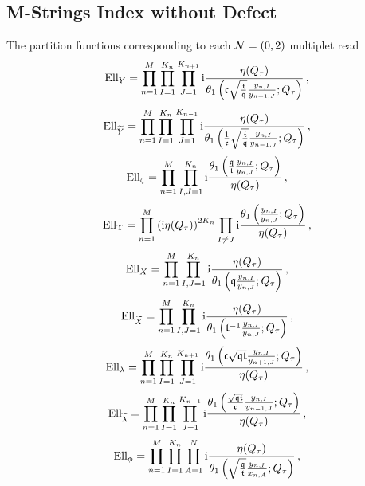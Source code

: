 \documentclass[main.tex]{subfiles}
\begin{document}
\subsection{M-Strings Index without Defect}\label{App:Ell}
The partition functions corresponding to each $\mathcal{N}=(0,2)$ multiplet read
\begin{equation}
\textrm{Ell}_Y=\prod_{n=1}^M\prod_{I=1}^{K_n}\prod_{J=1}^{K_{n+1}}\mathrm{i}\frac{\eta(Q_{\tau})}{\theta_1\left(\mathfrak{c}\sqrt{\frac{\mathfrak{t}}{\mathfrak{q}}}\frac{y_{n,I}}{y_{n+1,J}};Q_{\tau}\right)}\,,
\end{equation}
\begin{equation}
\textrm{Ell}_{\widetilde{Y}}=\prod_{n=1}^M\prod_{I=1}^{K_n}\prod_{J=1}^{K_{n-1}}\mathrm{i}\frac{\eta(Q_{\tau})}{\theta_1\left(\frac{1}{\mathfrak{c}}\sqrt{\frac{\mathfrak{t}}{\mathfrak{q}}}\frac{y_{n,I}}{y_{n-1,J}};Q_{\tau}\right)}\,,
\end{equation}
\begin{equation}
\textrm{Ell}_{\zeta}=\prod_{n=1}^M\prod_{I,J=1}^{K_n}\mathrm{i}\frac{\theta_1\left(\frac{\mathfrak{q}}{\mathfrak{t}}\frac{y_{n,I}}{y_{n,J}};Q_{\tau}\right)}{\eta(Q_{\tau})}\,,
\end{equation}
\begin{equation}
\textrm{Ell}_{\Upsilon}=\prod_{n=1}^M\left(\mathrm{i}\eta(Q_{\tau})\right)^{2K_n}\prod_{I\neq J}\mathrm{i}\frac{\theta_1\left(\frac{y_{n,I}}{y_{n,J}};Q_{\tau}\right)}{\eta(Q_{\tau})}\,,
\end{equation}
\begin{equation}
\textrm{Ell}_X=\prod_{n=1}^M\prod_{I,J=1}^{K_n}\mathrm{i}\frac{\eta(Q_{\tau})}{\theta_1\left(\mathfrak{q}\frac{y_{n,I}}{y_{n,J}};Q_{\tau}\right)}\,,
\end{equation}
\begin{equation}
\textrm{Ell}_{\widetilde{X}}=\prod_{n=1}^M\prod_{I,J=1}^{K_n}\mathrm{i}\frac{\eta(Q_{\tau})}{\theta_1\left(\mathfrak{t}^{-1}\frac{y_{n,I}}{y_{n,J}};Q_{\tau}\right)}\,,
\end{equation}
\begin{equation}
\textrm{Ell}_{\lambda}=\prod_{n=1}^M\prod_{I=1}^{K_n}\prod_{J=1}^{K_{n+1}}\mathrm{i}\frac{\theta_1\left(\mathfrak{c}\sqrt{\mathfrak{q}\mathfrak{t}}\frac{y_{n,I}}{y_{n+1,J}};Q_{\tau}\right)}{\eta(Q_{\tau})}\,,
\end{equation}
\begin{equation}
\textrm{Ell}_{\widetilde\lambda}=\prod_{n=1}^M\prod_{I=1}^{K_n}\prod_{J=1}^{K_{n-1}}\mathrm{i}\frac{\theta_1\left(\frac{\sqrt{\mathfrak{q}\mathfrak{t}}}{\mathfrak{c}}\frac{y_{n,I}}{y_{n-1,J}};Q_{\tau}\right)}{\eta(Q_{\tau})}\,,
\end{equation}
\begin{equation}
\textrm{Ell}_{\phi}=\prod_{n=1}^M\prod_{I=1}^{K_n}\prod_{A=1}^{N}\mathrm{i}\frac{\eta(Q_{\tau})}{\theta_1\left(\sqrt{\frac{\mathfrak{q}}{\mathfrak{t}}}\frac{y_{n,I}}{x_{n,A}};Q_{\tau}\right)}\,,
\end{equation}
\end{document}
